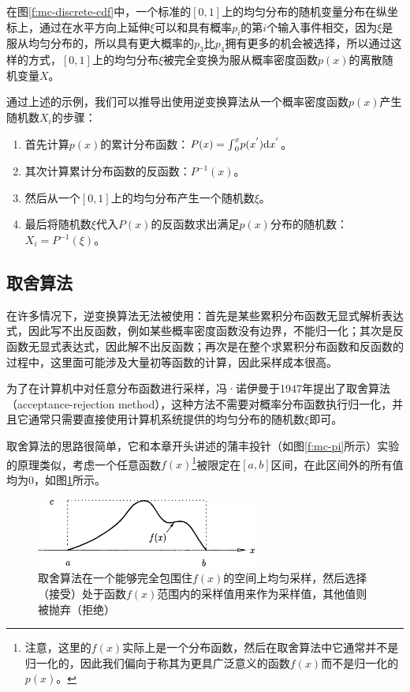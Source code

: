 在图\ref{f:mc-discrete-cdf}中，一个标准的$[0,1]$上的均匀分布的随机变量分布在纵坐标上，通过在水平方向上延伸$\xi$可以和具有概率$p_i$的第$i$个输入事件相交，因为$\xi$是服从均匀分布的，所以具有更大概率的$p_3$比$p_4$拥有更多的机会被选择，所以通过这样的方式，$[0,1]$上的均匀分布$\xi$被完全变换为服从概率密度函数$p(x)$的离散随机变量$X$。

通过上述的示例，我们可以推导出使用逆变换算法从一个概率密度函数$p(x)$产生随机数$X_i$的步骤：

\begin{enumerate}
	\item 首先计算$p(x)$的累计分布函数：$P(x)={\rm \int}_{0}^{x}p(x^{'}){\rm d}x^{'}$。
	\item 其次计算累计分布函数的反函数：$P^{-1}(x)$。
	\item 然后从一个$[0,1]$上的均匀分布产生一个随机数$\xi$。
	\item 最后将随机数$\xi$代入$P(x)$的反函数求出满足$p(x)$分布的随机数：$X_i=P^{-1}(\xi)$。
\end{enumerate}




\subsection{取舍算法}\label{sec:mc-accept-reject}
在许多情况下，逆变换算法无法被使用：首先是某些累积分布函数无显式解析表达式，因此写不出反函数，例如某些概率密度函数没有边界，不能归一化；其次是反函数无显式表达式，因此解不出反函数；再次是在整个求累积分布函数和反函数的过程中，这里面可能涉及大量初等函数的计算，因此采样成本很高。

为了在计算机中对任意分布函数进行采样，冯·诺伊曼于1947年提出了取舍算法（acceptance-rejection method），这种方法不需要对概率分布函数执行归一化，并且它通常只需要直接使用计算机系统提供的均匀分布的随机数$\xi$即可。

取舍算法的思路很简单，它和本章开头讲述的蒲丰投针（如图\ref{f:mc-pi}所示）实验的原理类似，考虑一个任意函数$f(x)$\footnote{注意，这里的$f(x)$实际上是一个分布函数，然后在取舍算法中它通常并不是归一化的，因此我们偏向于称其为更具广泛意义的函数$f(x)$而不是归一化的$p(x)$。}被限定在$[a,b]$区间，在此区间外的所有值均为0，如图\ref{f:mc-rejection-idea}所示。

\begin{figure}
\sidecaption
	\includegraphics[width=0.65\textwidth]{figures/mc/mc-6}
	\caption{取舍算法在一个能够完全包围住$f(x)$的空间上均匀采样，然后选择（接受）处于函数$f(x)$范围内的采样值用来作为采样值，其他值则被抛弃（拒绝）}
	\label{f:mc-rejection-idea}
\end{figure}

